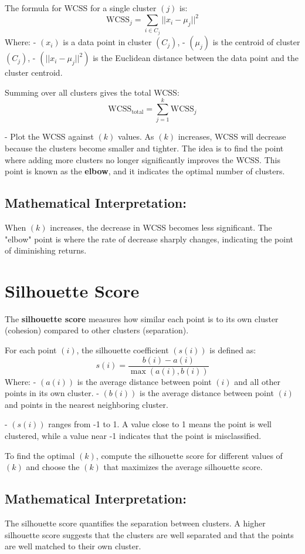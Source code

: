 \documentclass{article}
\begin{document}
The formula for WCSS for a single cluster $( j )$ is:
$$
\text{WCSS}_j = \sum_{i \in C_j} ||x_i - \mu_j||^2
$$
Where:
- $( x_i )$ is a data point in cluster $( C_j )$,
- $( \mu_j )$ is the centroid of cluster $( C_j )$,
- $( ||x_i - \mu_j||^2 )$ is the Euclidean distance between the data point and the cluster centroid.

Summing over all clusters gives the total WCSS:
$$
\text{WCSS}_{\text{total}} = \sum_{j=1}^{k} \text{WCSS}_j
$$

- Plot the WCSS against $( k )$ values. As $( k )$ increases, WCSS will decrease because the clusters become smaller and tighter. The idea is to find the point where adding more clusters no longer significantly improves the WCSS. This point is known as the \textbf{elbow}, and it indicates the optimal number of clusters.

\subsection*{ Mathematical Interpretation:}
When $( k )$ increases, the decrease in WCSS becomes less significant. The "elbow" point is where the rate of decrease sharply changes, indicating the point of diminishing returns.

\section*{Silhouette Score}

The \textbf{silhouette score} measures how similar each point is to its own cluster (cohesion) compared to other clusters (separation).

For each point $( i )$, the silhouette coefficient $( s(i) )$ is defined as:
$$
s(i) = \frac{b(i) - a(i)}{\max(a(i), b(i))}
$$
Where:
- $( a(i) )$ is the average distance between point $( i )$ and all other points in its own cluster.
- $( b(i) )$ is the average distance between point $( i )$ and points in the nearest neighboring cluster.

- $( s(i) )$ ranges from -1 to 1. A value close to 1 means the point is well clustered, while a value near -1 indicates that the point is misclassified.

To find the optimal $( k )$, compute the silhouette score for different values of $( k )$ and choose the $( k )$ that maximizes the average silhouette score.

\subsection*{ Mathematical Interpretation:}
The silhouette score quantifies the separation between clusters. A higher silhouette score suggests that the clusters are well separated and that the points are well matched to their own cluster.
\end{document}
